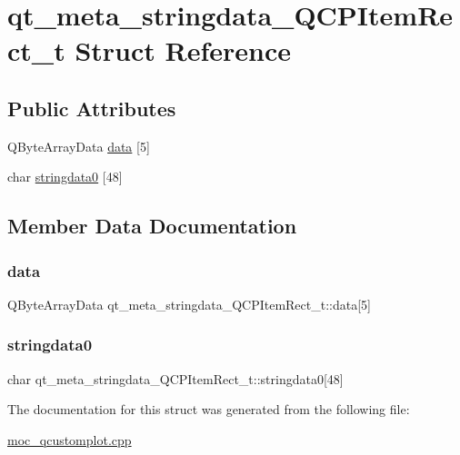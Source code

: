 \hypertarget{structqt__meta__stringdata__QCPItemRect__t}{}\section{qt\+\_\+meta\+\_\+stringdata\+\_\+\+Q\+C\+P\+Item\+Rect\+\_\+t Struct Reference}
\label{structqt__meta__stringdata__QCPItemRect__t}
\subsection*{Public Attributes}
\begin{DoxyCompactItemize}
\item 
Q\+Byte\+Array\+Data \mbox{\hyperlink{structqt__meta__stringdata__QCPItemRect__t_ab5a84b5db36cb982466a0b732f5e090f}{data}} \mbox{[}5\mbox{]}
\item 
char \mbox{\hyperlink{structqt__meta__stringdata__QCPItemRect__t_a216a9c8bff154ce0d04ce8eb79a5d408}{stringdata0}} \mbox{[}48\mbox{]}
\end{DoxyCompactItemize}


\subsection{Member Data Documentation}
\mbox{\label{structqt__meta__stringdata__QCPItemRect__t_ab5a84b5db36cb982466a0b732f5e090f}} 
\subsubsection{\texorpdfstring{data}{data}}
{\footnotesize\ttfamily Q\+Byte\+Array\+Data qt\+\_\+meta\+\_\+stringdata\+\_\+\+Q\+C\+P\+Item\+Rect\+\_\+t\+::data\mbox{[}5\mbox{]}}

\mbox{\label{structqt__meta__stringdata__QCPItemRect__t_a216a9c8bff154ce0d04ce8eb79a5d408}} 
\subsubsection{\texorpdfstring{stringdata0}{stringdata0}}
{\footnotesize\ttfamily char qt\+\_\+meta\+\_\+stringdata\+\_\+\+Q\+C\+P\+Item\+Rect\+\_\+t\+::stringdata0\mbox{[}48\mbox{]}}



The documentation for this struct was generated from the following file\+:\begin{DoxyCompactItemize}
\item 
\mbox{\hyperlink{moc__qcustomplot_8cpp}{moc\+\_\+qcustomplot.\+cpp}}\end{DoxyCompactItemize}
